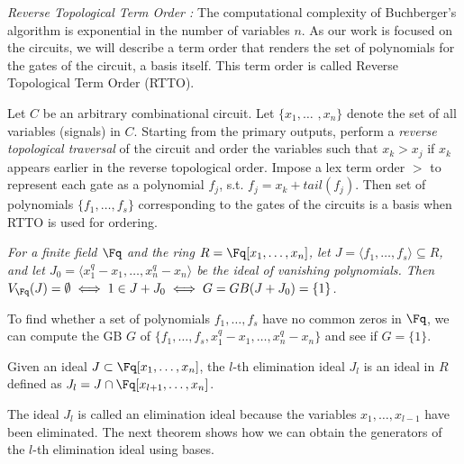 \begin{Definition}
\label{def:rtto}
\par {\it Reverse Topological Term Order \cite{lv:tcad2013}:}
The computational complexity of Buchberger's algorithm is exponential
in the number of variables $n$. As our work is focused on the circuits,
we will describe a term order that renders the set of polynomials for 
the gates of the circuit, a \Grobner basis itself. This term order 
is called Reverse Topological Term Order (RTTO).

\par Let $C$ be an arbitrary combinational
circuit. Let $\{x_1, \dots$ $, x_n\}$ denote the set of all variables
(signals) in $C$. Starting from the primary outputs, perform
a {\it reverse topological traversal} of the circuit and order the
variables such that $x_k > x_j$ if $x_k$ appears earlier in the
reverse topological order. Impose a lex term order $>$ to represent each
gate as a polynomial $f_j$, s.t. $f_j = x_k + tail(f_j)$. Then 
set of polynomials $\{f_1,\dots,f_s\}$ corresponding to the gates of the circuits 
is a \Grobner basis when RTTO is used for ordering.
\end{Definition}
\begin{Theorem}
\label{thm:weak-ns-ff}
{\it For a finite field $\Fq$ and the ring $R = \Fq[x_1, \dots, x_n]$, let
$J = \langle f_1, \dots, f_s\rangle \subseteq R$, and let $J_0 = \langle
x_1^q-x_1, \dots, x_n^q -  x_n\rangle$ be the ideal of vanishing
polynomials. Then $V_{\Fq}(J) = \emptyset \iff 1 \in J + J_0 \iff G =
GB(J+J_0) = \{1\}$. }

\par To find whether a set of polynomials $f_1,\dots,f_s$ have no common
zeros in $\Fq$, we can compute the GB $G$ of
$\{f_1,\dots,f_s,x_1^q-x_1,\dots,x_n^q-x_n\}$ and see if $G = \{1\}$. 
\end{Theorem}

\begin{Definition}
Given an ideal $J \subset \Fq[x_1,\dots,x_n]$, the $l$-th elimination
ideal $J_l$ is an ideal in $R$ defined as $J_l = J \cap \Fq[x_{l+1},\dots,x_n]$.
\end{Definition}

The ideal $J_l$ is called an elimination ideal because the variables $x_1,\dots,x_{l-1}$
have been eliminated.
The next theorem shows how we can obtain the generators of the $l$-th
elimination ideal using \Grobner bases.

